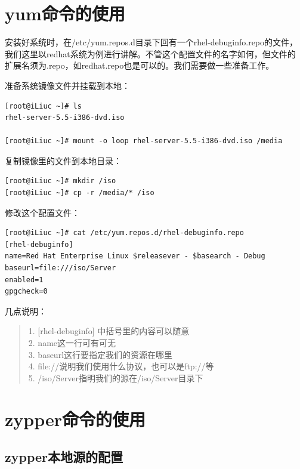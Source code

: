 \section{yum命令的使用}
\label{sec:yumCmd}
安装好系统时，在/etc/yum.repos.d目录下回有一个rhel-debuginfo.repo的文件，
我们这里以redhat系统为例进行讲解。不管这个配置文件的名字如何，但文件的
扩展名须为.repo，如redhat.repo也是可以的。我们需要做一些准备工作。

准备系统镜像文件并挂载到本地：

\small{
\begin{verbatim}
[root@iLiuc ~]# ls 
rhel-server-5.5-i386-dvd.iso

[root@iLiuc ~]# mount -o loop rhel-server-5.5-i386-dvd.iso /media
\end{verbatim}
}
\normalsize

复制镜像里的文件到本地目录：

\small{
\begin{verbatim}
[root@iLiuc ~]# mkdir /iso
[root@iLiuc ~]# cp -r /media/* /iso
\end{verbatim}
}
\normalsize

修改这个配置文件：

\small{
\begin{verbatim}
[root@iLiuc ~]# cat /etc/yum.repos.d/rhel-debuginfo.repo
[rhel-debuginfo]
name=Red Hat Enterprise Linux $releasever - $basearch - Debug
baseurl=file:///iso/Server
enabled=1
gpgcheck=0
\end{verbatim}
}
\normalsize

几点说明：

\begin{quote}
    1. [rhel-debuginfo] 中括号里的内容可以随意 \\
    2. name这一行可有可无 \\
    3. baseurl这行要指定我们的资源在哪里 \\
    4. file://说明我们使用什么协议，也可以是ftp://等 \\
    5. /iso/Server指明我们的源在/iso/Server目录下 

\end{quote}

\section{zypper命令的使用}
\label{sec:zypperCmd}

\subsection{zypper本地源的配置}
\label{subsec:zypperLocalrepo}


